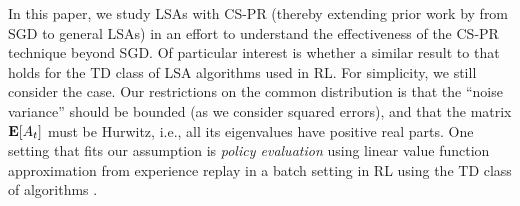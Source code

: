 In this paper, we study LSAs with CS-PR (thereby extending prior work by \citet{bach} from SGD to general LSAs) 
in an effort to understand the effectiveness of the CS-PR technique beyond SGD.
Of particular interest is whether a similar result to that  \citet{bach} holds
for the TD class of LSA algorithms used in RL.
For simplicity, we still consider the \iid case. Our restrictions on the common distribution is that the ``noise variance'' should be bounded (as we consider squared errors), and that the matrix $\mathbf{E}[A_t]$ must be Hurwitz, i.e., all its eigenvalues have positive real parts. %
One setting that fits our assumption is \emph{policy evaluation} \cite{dann} using linear value function approximation from experience replay \cite{lin} in a batch setting \cite{lange} in RL using the TD class of algorithms \cite{sutton,konda-tsitsiklis,gtd,gtd2,gtdmp}. 

